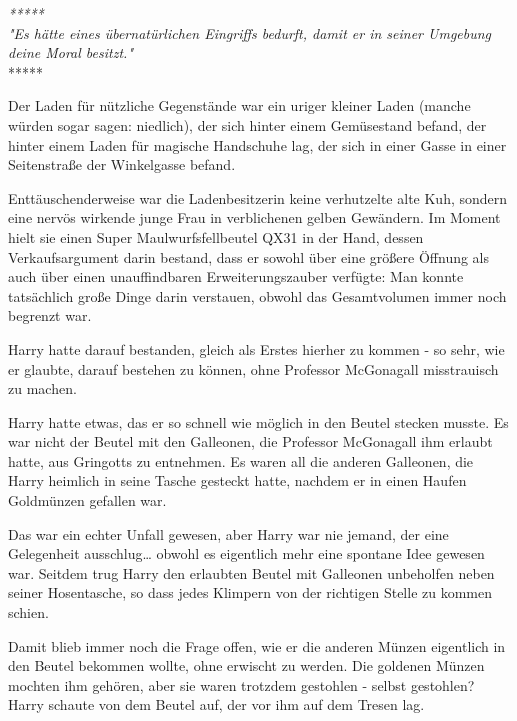 

\hypertarget{der-fundamentale-attributionsfehler}{%

\emph{*****}\\ \emph{"Es hätte eines übernatürlichen Eingriffs bedurft, damit er in seiner Umgebung deine Moral besitzt."}\\ *****

Der Laden für nützliche Gegenstände war ein uriger kleiner Laden (manche würden sogar sagen: niedlich), der sich hinter einem Gemüsestand befand, der hinter einem Laden für magische Handschuhe lag, der sich in einer Gasse in einer Seitenstraße der Winkelgasse befand.

Enttäuschenderweise war die Ladenbesitzerin keine verhutzelte alte Kuh, sondern eine nervös wirkende junge Frau in verblichenen gelben Gewändern. Im Moment hielt sie einen Super Maulwurfsfellbeutel QX31 in der Hand, dessen Verkaufsargument darin bestand, dass er sowohl über eine größere Öffnung als auch über einen unauffindbaren Erweiterungszauber verfügte: Man konnte tatsächlich große Dinge darin verstauen, obwohl das Gesamtvolumen immer noch begrenzt war.

Harry hatte darauf bestanden, gleich als Erstes hierher zu kommen - so sehr, wie er glaubte, darauf bestehen zu können, ohne Professor McGonagall misstrauisch zu machen.

Harry hatte etwas, das er so schnell wie möglich in den Beutel stecken musste. Es war nicht der Beutel mit den Galleonen, die Professor McGonagall ihm erlaubt hatte, aus Gringotts zu entnehmen. Es waren all die anderen Galleonen, die Harry heimlich in seine Tasche gesteckt hatte, nachdem er in einen Haufen Goldmünzen gefallen war.

Das war ein echter Unfall gewesen, aber Harry war nie jemand, der eine Gelegenheit ausschlug… obwohl es eigentlich mehr eine spontane Idee gewesen war. Seitdem trug Harry den erlaubten Beutel mit Galleonen unbeholfen neben seiner Hosentasche, so dass jedes Klimpern von der richtigen Stelle zu kommen schien.

Damit blieb immer noch die Frage offen, wie er die anderen Münzen eigentlich in den Beutel bekommen wollte, ohne erwischt zu werden. Die goldenen Münzen mochten ihm gehören, aber sie waren trotzdem gestohlen - selbst gestohlen? Harry schaute von dem Beutel auf, der vor ihm auf dem Tresen lag.

}
